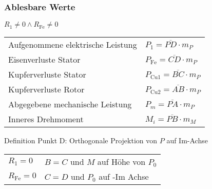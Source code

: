 \begin{sectionbox}
\subsubsection{Ablesbare Werte}
\begin{emphbox}
  $R_1\neq 0\wedge R_\text{Fe}\neq 0$
\end{emphbox}
\begin{tabular}{p{4cm}l}
Aufgenommene elektrische Leistung & $P_1 = \overline{PD}\cdot m_P$\\
Eisenverluste Stator & $P_\text{Fe} = \overline{CD}\cdot m_P$\\
Kupferverluste Stator & $P_{\text{Cu}1} = \overline{BC}\cdot m_P$\\
Kupferverluste Rotor & $P_{\text{Cu}2} = \overline{AB}\cdot m_P$\\
Abgegebene mechanische Leistung & $P_m = \overline{PA}\cdot m_P$\\
Inneres Drehmoment & $M_i = \overline{PB}\cdot m_M$
\end{tabular}
\begin{symbolbox}
  Definition Punkt D: Orthogonale Projektion von $P$ auf Im-Achse\\
  \begin{tabularx}{\columnwidth}{lX}
  $R_1 = 0$ & $B = C$ und $M$ auf Höhe von $P_0$\\
  $R_\text{Fe} = 0$ & $C = D$ und $P_0$ auf -Im Achse
  \end{tabularx}
\end{symbolbox}


\end{sectionbox}

